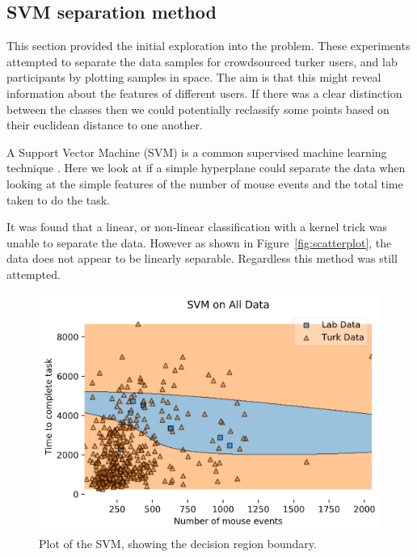 \documentclass{article}
\begin{document}

\subsection{SVM separation method}

This section provided the initial exploration into the problem.
These experiments attempted to separate the data samples for crowdsourced turker users, and lab participants by plotting samples in space.
The aim is that this might reveal information about the features of different users.
If there was a clear distinction between the classes then we could potentially reclassify some points based on their euclidean distance to one another.

A Support Vector Machine (SVM) is a common supervised machine learning technique \cite{noble2006support}.
Here we look at if a simple hyperplane could separate the data when looking at the simple features of the number of mouse events and the total time taken to do the task. 

It was found that a linear, or non-linear classification with a kernel trick was unable to separate the data.
However as shown in Figure~\ref{fig:scatterplot}, the data does not appear to be linearly separable.
Regardless this method was still attempted.

\begin{figure}[ht]
    \centering
    \includegraphics[scale=0.7]{Images/SVM-Decision-Region-Boundary.png}
    \caption{Plot of the SVM, showing the decision region boundary.}
    \label{fig:SVM}
\end{figure}
\end{document}

